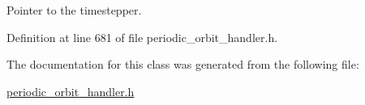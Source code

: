 Pointer to the timestepper. 



Definition at line 681 of file periodic\+\_\+orbit\+\_\+handler.\+h.



The documentation for this class was generated from the following file\+:\begin{DoxyCompactItemize}
\item 
\hyperlink{periodic__orbit__handler_8h}{periodic\+\_\+orbit\+\_\+handler.\+h}\end{DoxyCompactItemize}
